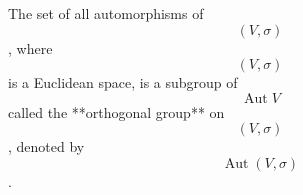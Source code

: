 The set of all automorphisms of $$(V, \sigma)$$, where $$(V, \sigma)$$ is a Euclidean space, is a subgroup of $$\operatorname{Aut} V$$ called the **orthogonal group** on $$(V, \sigma)$$, denoted by $$\operatorname{Aut}(V, \sigma)$$.
